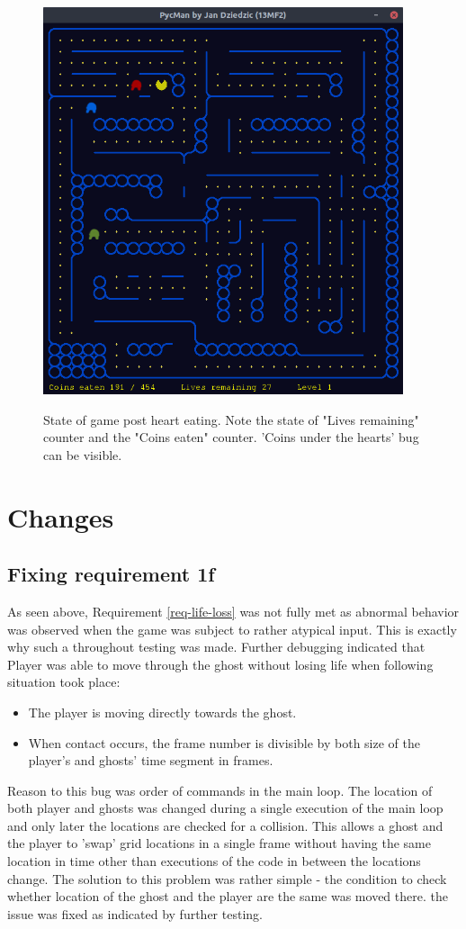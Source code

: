 \documentclass[11pt,a4paper,notitlepage]{report}
\newcommand{\dsubsection}[1]{\FloatBarrier \subsection{#1}}
\newenvironment{img}{
	\begin{center}
		\begin{figure}[H]
			\begin{center}
			
}{
	\end{center}
		\end{figure}
			\end{center}
}
\begin{document}
			\begin{img}
				\includegraphics[width=300pt]{images/hearts-working1.png}\\
				\caption{State of game post heart eating. Note the state of "Lives remaining" counter and the "Coins eaten" counter. 'Coins under the hearts' bug can be visible.}
				\label{coins-under-hearts}
			\end{img}
			
		\section{Changes}
			\dsubsection{Fixing requirement 1f}
				As seen above, Requirement \ref{req-life-loss} was not fully met as abnormal behavior was observed when the game was subject to rather atypical input. This is exactly why such a throughout testing was made. Further debugging indicated that Player was able to move through the ghost without losing life when following situation took place:\\
				\begin{itemize}
					\item The player is moving directly towards the ghost.
					\item When contact occurs, the frame number is divisible by both size of the player's and ghosts' time segment in frames.
				\end{itemize}
				Reason to this bug was order of commands in the main loop. The location of both player and ghosts was changed during a single execution of the main loop and only later the locations are checked for a collision. This allows a ghost and the player to 'swap' grid locations in a single frame without having the same location in time other than executions of the code in between the locations change. The solution to this problem was rather simple - the condition to check whether location of the ghost and the player are the same was moved there. the issue was fixed as indicated by further testing.
				
\end{document}
